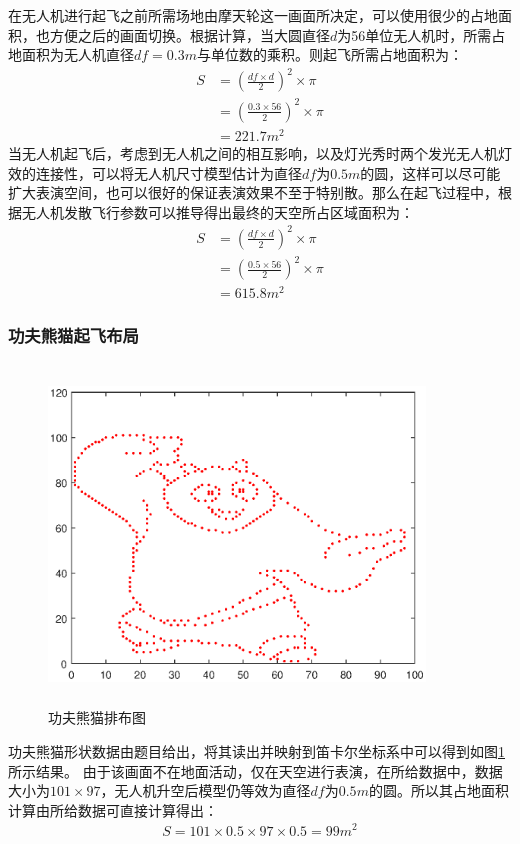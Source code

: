 \documentclass[UTF8,12pt]{ctexart}
\begin{document}
在无人机进行起飞之前所需场地由摩天轮这一画面所决定，可以使用很少的占地面积，也方便之后的画面切换。根据计算，当大圆直径$d$为56单位无人机时，所需占地面积为无人机直径$df=0.3m$与单位数的乘积。则起飞所需占地面积为：
\begin{align*}
    S &= (\frac{df\times d}{2})^2 \times \pi\\
    & = (\frac{0.3 \times 56}{2})^2 \times \pi\\
    & = 221.7m^2
\end{align*}
当无人机起飞后，考虑到无人机之间的相互影响，以及灯光秀时两个发光无人机灯效的连接性，可以将无人机尺寸模型估计为直径$df$为$0.5m$的圆，这样可以尽可能扩大表演空间，也可以很好的保证表演效果不至于特别散。那么在起飞过程中，根据无人机发散飞行参数可以推导得出最终的天空所占区域面积为：
\begin{align*}
    S &= (\frac{df\times d}{2})^2 \times \pi\\
    & = (\frac{0.5 \times 56}{2})^2 \times \pi\\
    & = 615.8m^2
\end{align*}
\subsubsection{功夫熊猫起飞布局}
\begin{figure}[htbp]
    \centering
    \includegraphics[height=9.0cm,width=10.0cm]{img/draw_panda.eps}
    \caption{功夫熊猫排布图}
    \label{功夫熊猫排布}
\end{figure}
功夫熊猫形状数据由题目给出，将其读出并映射到笛卡尔坐标系中可以得到如图\ref{功夫熊猫排布}所示结果。
由于该画面不在地面活动，仅在天空进行表演，在所给数据中，数据大小为$101\times97$，无人机升空后模型仍等效为直径$df$为$0.5m$的圆。所以其占地面积计算由所给数据可直接计算得出：
\begin{align*}
    S = 101 \times 0.5 \times 97 \times 0.5=99m^2
\end{align*}
\end{document}
